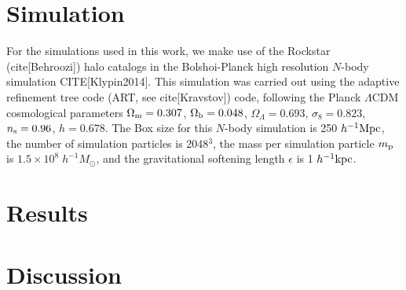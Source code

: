\documentclass[12pt, preprint]{aastex}
\begin{document}
\section{Simulation}
For the simulations used in this work, we make use of the Rockstar (cite[Behroozi]) halo catalogs in the Bolshoi-Planck high 
resolution $N$-body simulation CITE[Klypin2014]. This simulation was carried out using the adaptive refinement tree code 
(ART, see cite[Kravstov]) code, following the Planck $\Lambda$CDM cosmological parameters 
$\Omega_{\rm m} = 0.307$, $\Omega_{\rm b} = 0.048$, $\Omega_{\Lambda} = 0.693$, $\sigma_{8} = 0.823$, $n_{\rm s}=0.96$, 
$h=0.678$. The Box size for this $N$-body simulation is 250 $h^{-1} \rm{Mpc}$, the number of simulation particles is 2048$^3$, 
the mass per simulation particle $m_{\rm p}$ is $1.5 \times 10^{8} \; h^{-1} M_{\odot}$, and the gravitational softening length 
$\epsilon$ is 1 $h^{-1} \rm{kpc}$. 

\section{Results}



\section{Discussion}
\end{document}
